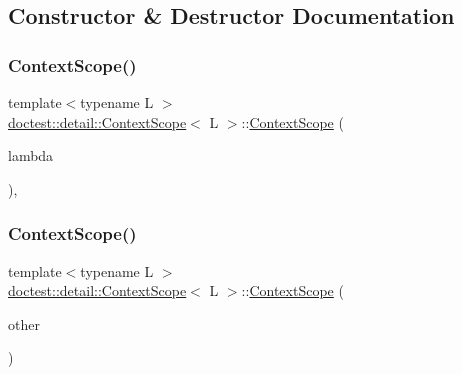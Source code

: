 \subsection{Constructor \& Destructor Documentation}
\mbox{\label{classdoctest_1_1detail_1_1ContextScope_a344c76a0374615d567a084c0a0ffd215}} 
\subsubsection{\texorpdfstring{Context\+Scope()}{ContextScope()}\hspace{0.1cm}{\footnotesize\ttfamily [1/2]}}
{\footnotesize\ttfamily template$<$typename L $>$ \\
\hyperlink{classdoctest_1_1detail_1_1ContextScope}{doctest\+::detail\+::\+Context\+Scope}$<$ L $>$\+::\hyperlink{classdoctest_1_1detail_1_1ContextScope}{Context\+Scope} (\begin{DoxyParamCaption}\item[{const L \&}]{lambda }\end{DoxyParamCaption})\hspace{0.3cm}{\ttfamily [inline]}, {\ttfamily [explicit]}}

\mbox{\label{classdoctest_1_1detail_1_1ContextScope_afca3228fdeb0e86257a21f826c4247ff}} 
\subsubsection{\texorpdfstring{Context\+Scope()}{ContextScope()}\hspace{0.1cm}{\footnotesize\ttfamily [2/2]}}
{\footnotesize\ttfamily template$<$typename L $>$ \\
\hyperlink{classdoctest_1_1detail_1_1ContextScope}{doctest\+::detail\+::\+Context\+Scope}$<$ L $>$\+::\hyperlink{classdoctest_1_1detail_1_1ContextScope}{Context\+Scope} (\begin{DoxyParamCaption}\item[{\hyperlink{classdoctest_1_1detail_1_1ContextScope}{Context\+Scope}$<$ L $>$ \&\&}]{other }\end{DoxyParamCaption})\hspace{0.3cm}{\ttfamily [inline]}}

